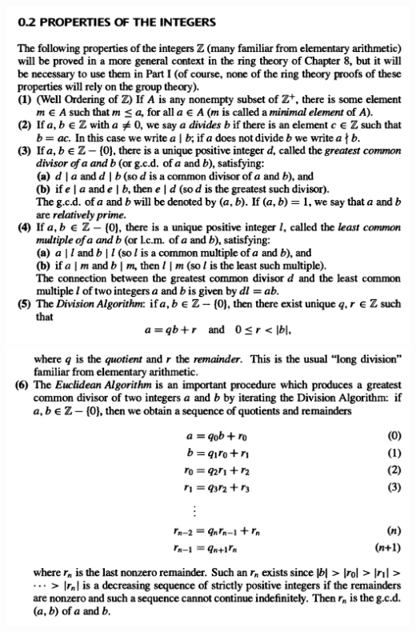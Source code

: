 \begin{mdframed}
\includegraphics[width=400pt]{img/foundations--set-theory--number-theory-82fa.png}
\includegraphics[width=400pt]{img/foundations--set-theory--number-theory-179a.png}
\end{mdframed}
